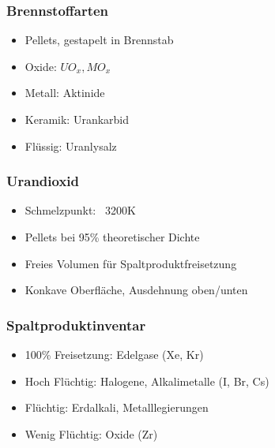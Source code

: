 \documentclass[12pt]{article}
\begin{document}
\subsubsection{Brennstoffarten}
\begin{itemize}
	\item Pellets, gestapelt in Brennstab
	\item Oxide: \(UO_x, MO_x\)
	\item Metall: Aktinide
	\item Keramik: Urankarbid
	\item Flüssig: Uranlysalz
\end{itemize}

\subsubsection{Urandioxid}
\begin{itemize}
	\item Schmelzpunkt: ~3200K
	\item Pellets bei 95\% theoretischer Dichte
	\item Freies Volumen für Spaltproduktfreisetzung
	\item Konkave Oberfläche, Ausdehnung oben/unten
\end{itemize}

\subsubsection{Spaltproduktinventar}
\begin{itemize}
	\item 100\% Freisetzung: Edelgase (Xe, Kr)
	\item Hoch Flüchtig: Halogene, Alkalimetalle (I, Br, Cs)
	\item Flüchtig: Erdalkali, Metalllegierungen
	\item Wenig Flüchtig: Oxide (Zr)
\end{itemize}
\end{document}
